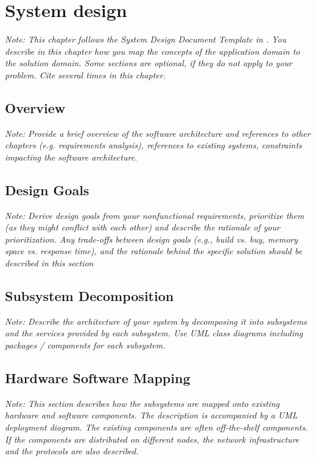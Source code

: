 \documentclass[a4paper,12pt,twoside]{report}
\begin{document}
\chapter{System design}

\textit{Note: This chapter follows the System Design Document Template in \cite{bruegge2004object}. 
You describe in this chapter how you map the concepts of the application domain to the solution domain. Some sections are optional, if they do not apply to your problem.
Cite \cite{bruegge2004object} several times in this chapter.}

\section{Overview}

\textit{Note: Provide a brief overview of the software architecture and references to other chapters (e.g. requirements analysis), references to existing systems, constraints impacting the software architecture.}

\section{Design Goals}

\textit{Note: Derive design goals from your nonfunctional requirements, prioritize them (as they might conflict with each other) and describe the rationale of your prioritization. Any trade-offs between design goals (e.g., build vs. buy, memory space vs. response time),
and the rationale behind the specific solution should be described in this section}

\section{Subsystem Decomposition}

\textit{Note: Describe the architecture of your system by decomposing it into subsystems and the services provided by each subsystem. Use UML class diagrams including packages / components for each subsystem.}

\section{Hardware Software Mapping}

\textit{Note: This section describes how the subsystems are mapped onto existing hardware and software components. The description is accompanied by a UML deployment diagram. The existing components are often off-the-shelf components. If the components are distributed on different nodes, the network infrastructure and the protocols are also described.}
\end{document}
